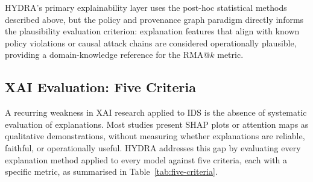 \documentclass[12pt,a4paper]{report}
\begin{document}
HYDRA's primary explainability layer uses the post-hoc statistical methods described above, but the policy and provenance graph paradigm directly informs the plausibility evaluation criterion: explanation features that align with known policy violations or causal attack chains are considered operationally plausible, providing a domain-knowledge reference for the RMA@$k$ metric.

\subsection{XAI Evaluation: Five Criteria}
\label{sec:xai-eval}

A recurring weakness in XAI research applied to IDS is the absence of systematic evaluation of explanations. Most studies present SHAP plots or attention maps as qualitative demonstrations, without measuring whether explanations are reliable, faithful, or operationally useful. HYDRA addresses this gap by evaluating every explanation method applied to every model against five criteria, each with a specific metric, as summarised in Table~\ref{tab:five-criteria}.
\end{document}
